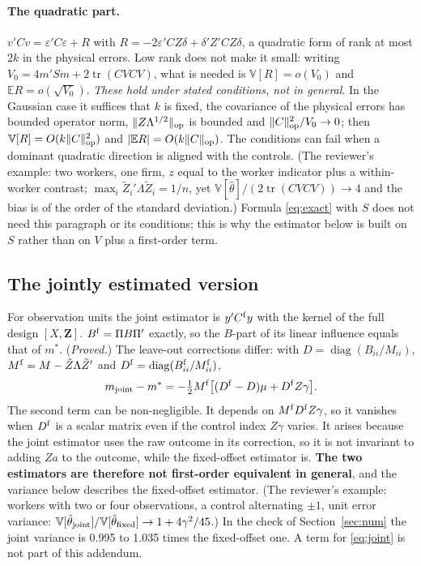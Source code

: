 \documentclass[11pt]{article}
\newcommand{\E}{\mathbb{E}}
\newcommand{\Var}{\mathbb{V}}
\newcommand{\tr}{\operatorname{tr}}
\begin{document}
\paragraph{The quadratic part.} $v'Cv=\varepsilon'C\varepsilon+R$ with
$R=-2\varepsilon'CZ\delta+\delta'Z'CZ\delta$, a quadratic form of rank at most $2k$ in the physical errors. Low rank
does not make it small: writing $V_0=4m'Sm+2\tr(CVCV)$, what is needed is
$\Var[R]=o(V_0)$ and $\E R=o(\sqrt{V_0})$. \emph{These hold under stated conditions, not in general}. In the Gaussian case
it suffices that $k$ is fixed, the covariance of the physical errors has bounded operator norm,
$\|Z\Lambda^{1/2}\|_{\rm op}$ is bounded and $\|C\|_{\rm op}^2/V_0\to0$; then $\Var[R]=O(k\|C\|_{\rm op}^2)$ and
$|\E R|=O(k\|C\|_{\rm op})$. The conditions can fail when a dominant quadratic direction is aligned with the controls. (The reviewer's example: two workers,
one firm, $z$ equal to the worker indicator plus a within-worker contrast; $\max_i\tilde Z_i'\Lambda\tilde Z_i=1/n$,
yet $\Var[\hat\theta]/(2\tr(CVCV))\to4$ and the bias is of the order of the standard deviation.) Formula
\eqref{eq:exact} with $S$ does not need this paragraph or its conditions; this is why the estimator below is built on $S$ rather than
on $V$ plus a first-order term.

\subsection{The jointly estimated version}\label{sec:joint}
For observation units the joint estimator is $y'C^{\rm f}y$ with the kernel of the full design $[X,\mathbf Z]$.
$B^{\rm f}=\Pi B\Pi'$ exactly, so the $B$-part of its linear influence equals that of $m^\ast$. (\emph{Proved.}) The
leave-out corrections differ: with $D=\operatorname{diag}(B_{ii}/M_{ii})$, $M^{\rm f}=M-\tilde Z\Lambda\tilde Z'$ and
$D^{\rm f}=\operatorname{diag}(B^{\rm f}_{ii}/M^{\rm f}_{ii})$,
\begin{equation}\label{eq:joint}
 m_{\rm joint}-m^\ast=-\tfrac12M^{\rm f}\bigl[(D^{\rm f}-D)\mu+D^{\rm f}Z\gamma\bigr].
\end{equation}
The second term can be non-negligible. It depends on $M^{\rm f}D^{\rm f}Z\gamma$, so it vanishes when $D^{\rm f}$ is a
scalar matrix even if the control index $Z\gamma$ varies. It arises because the joint estimator uses the raw outcome in
its correction, so it is not invariant to adding $Za$ to the outcome, while the fixed-offset estimator is.
\textbf{The two estimators are therefore not first-order equivalent in general}, and the variance below describes
the fixed-offset estimator. (The reviewer's example: workers with two or four observations, a control alternating
$\pm1$, unit error variance: $\Var[\hat\theta_{\rm joint}]/\Var[\hat\theta_{\rm fixed}]\to1+4\gamma^2/45$.) In the
check of Section~\ref{sec:num} the joint variance is 0.995 to 1.035 times the
fixed-offset one. A term for \eqref{eq:joint} is not part of this addendum.
\end{document}
